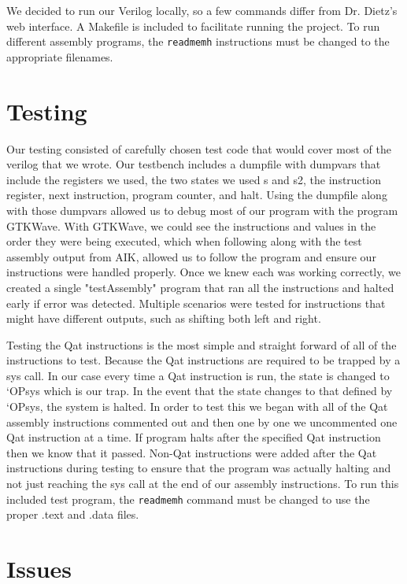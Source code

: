 \documentclass{sig-alternate-05-2015}
\begin{document}
We decided to run our Verilog locally, so a few commands differ from Dr. Dietz's web interface. A Makefile is included to facilitate running the project. To run different assembly programs, the \texttt{readmemh} instructions must be changed to the appropriate filenames.


\section{Testing}
Our testing consisted of carefully chosen test code that would cover most of the verilog that we wrote. Our testbench includes a dumpfile with dumpvars that include the registers we used, the two states we used s and s2, the instruction register, next instruction, program counter, and halt. Using the dumpfile along with those dumpvars allowed us to debug most of our program with the program GTKWave. With GTKWave, we could see the instructions and values in the order they were being executed, which when following along with the test assembly output from AIK, allowed us to follow the program and ensure our instructions were handled properly. Once we knew each was working correctly, we created a single "testAssembly" program that ran all the instructions and halted early if error was detected. Multiple scenarios were tested for instructions that might have different outputs, such as shifting both left and right.

Testing the Qat instructions is the most simple and straight forward of all of the instructions to test. Because the Qat instructions are required to be trapped by a sys call. In our case every time a Qat instruction is run, the state is changed to `OPsys which is our trap. In the event that the state changes to that defined by `OPsys, the system is halted. In order to test this we began with all of the Qat assembly instructions commented out and then one by one we uncommented one Qat instruction at a time. If program halts after the specified Qat instruction then we know that it passed. Non-Qat instructions were added after the Qat instructions during testing to ensure that the program was actually halting and not just reaching the sys call at the end of our assembly instructions. To run this included test program, the \texttt{readmemh} command must be changed to use the proper .text and .data files.

\section{Issues}
\end{document}
